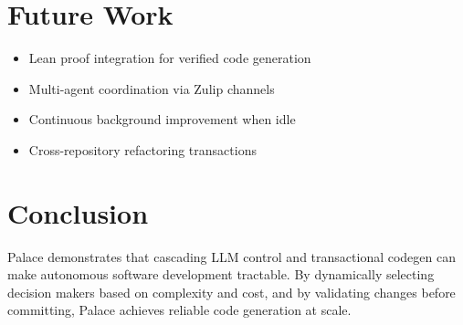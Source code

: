 \documentclass[11pt,a4paper]{article}
\begin{document}
\section{Future Work}

\begin{itemize}
    \item Lean proof integration for verified code generation
    \item Multi-agent coordination via Zulip channels
    \item Continuous background improvement when idle
    \item Cross-repository refactoring transactions
\end{itemize}

\section{Conclusion}

Palace demonstrates that cascading LLM control and transactional codegen
can make autonomous software development tractable.
By dynamically selecting decision makers based on complexity and cost,
and by validating changes before committing,
Palace achieves reliable code generation at scale.


% 
\end{document}
